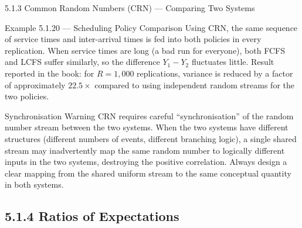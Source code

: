 \documentclass[aspectratio=169,10pt]{beamer}
\begin{document}
\begin{frame}[allowframebreaks]{5.1.3 Common Random Numbers (CRN) --- Comparing Two Systems}
\begin{exampleblock}{Example 5.1.20 --- Scheduling Policy Comparison}
  Using CRN, the same sequence of service times and inter-arrival times is
  fed into both policies in every replication.
  When service times are long (a bad run for everyone), both FCFS and LCFS
  suffer similarly, so the difference $Y_1 - Y_2$ fluctuates little.
  Result reported in the book: for $R = 1{,}000$ replications, variance
  is reduced by a factor of approximately $22.5\times$ compared to using
  independent random streams for the two policies.
\end{exampleblock}

\begin{alertblock}{Synchronisation Warning}
  CRN requires careful ``synchronisation'' of the random number stream between
  the two systems.  When the two systems have different structures (different
  numbers of events, different branching logic), a single shared stream may
  inadvertently map the same random number to logically different inputs in
  the two systems, destroying the positive correlation.
  Always design a clear mapping from the shared uniform stream to the same
  conceptual quantity in both systems.
\end{alertblock}

\end{frame}

\subsection{5.1.4 Ratios of Expectations}
\end{document}
